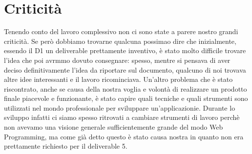 \section{Criticità}
Tenendo conto del lavoro complessivo non ci sono state a parere nostro grandi criticità.
Se però dobbiamo trovarne qualcuna possimao dire che inizialmente, essendo il D1 un deliverable prettamente inventivo, è stato molto difficile trovare l'idea che poi avrmmo dovuto consegnare: spesso, mentre si pensava di aver deciso definitivamente l'idea da riportare sul documento, qualcuno di noi trovava altre idee interessanti e il lavoro ricominciava.
Un'altro problema che è stato riscontrato, anche se causa della nostra voglia e volontà di realizzare un prodotto finale piacevole e funzionante, è stato capire quali tecniche e quali strumenti sono utilizzati nel mondo professionale per sviluppare un'applicazionie. Durante lo sviluppo infatti ci siamo spesso ritrovati a cambiare strumenti di lavoro perchè non avevamo una visione generale sufficientemente grande del modo Web Programming, ma come già detto questo è stato causa nostra in quanto non era prettamente richiesto per il deliverable 5.